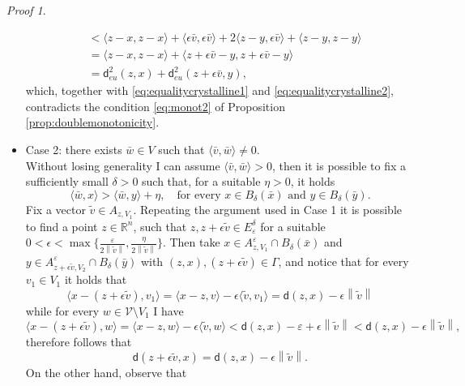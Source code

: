 \documentclass[11pt,twoside,a4paper]{article}
\newcommand{\scal}[2]{\ensuremath{\langle #1 , #2 \rangle}} %
\newcommand{\norm}[1]{\left\lVert#1\right\rVert}
\newcommand{\R}{\mathbb{R}}
\newcommand{\thmsymbol}{\( \square \)}
\newcommand{\di}{\mathsf d} %
\theoremstyle{theorem}
\theoremstyle{definition}
\theoremstyle{remark}
\theoremstyle{proof}
\newtheorem*{pro}{Proof}
\newenvironment{pr}{\begin{pro}%
 \renewcommand{\qedsymbol}{\thmsymbol}\pushQED{\qed}}%
 {\popQED\end{pro}}
\begin{document}
\begin{pr}
\begin{itemize}
\begin{align*}
        &< \scal{z-x}{z-x}+\scal{\epsilon \bar v}{\epsilon \bar v}+2\scal{z-y}{\epsilon \bar v}+ \scal{z-y}{z-y} \\
        &=  \scal{z-x}{z-x} + \scal{z+\epsilon \bar v-y}{ z+\epsilon \bar v -y} \\
        &= \di_{eu}^2 (z,x) + \di_{eu}^2(z+\epsilon \bar v, y),
    \end{align*}
    which, together with \eqref{eq:equalitycrystalline1} and \eqref{eq:equalitycrystalline2}, contradicts the condition \eqref{eq:monot2} of Proposition \ref{prop:doublemonotonicity}.
    \item Case 2: there exists $\bar w \in V$ such that $\scal{\bar v}{\bar w}\ne 0$.\\
    Without losing generality I can assume $\scal{\bar v}{\bar w}> 0$, then it is possible to fix a sufficiently small $\delta>0$ such that, for a suitable $\eta>0$, it holds
     \begin{equation*}
        \scal{\bar w}{x}> \scal{\bar w}{y}+\eta, \quad \text{for every } x \in B_\delta (\bar x) \text{ and } y \in B_\delta (\bar y). 
    \end{equation*}
    Fix a vector $\tilde v \in A_{z,V_1}$. Repeating the argument used in Case 1 it is possible to find a point $z\in \R^n$, such that $z,z+\epsilon\tilde v \in E_\varepsilon^\delta$ for a suitable $0<\epsilon< \max \big\{ \frac \varepsilon {2 \norm{\tilde v}}, \frac  \eta {2 \norm{\tilde v}} \big\}$. Then take $x\in A_{z,V_1}^\varepsilon\cap B_\delta(\bar x)$ and $y\in A_{z+\epsilon \tilde v,V_2}^\varepsilon \cap B_\delta(\bar y)$ with $(z,x),(z+\epsilon\tilde v)\in \Gamma$, and notice that for every $v_1 \in V_1$ it holds that
    \begin{equation*}
        \scal{x-(z+\epsilon \tilde v)}{v_1} = \scal{x-z}{v}  - \epsilon \scal{ \tilde v}{v_1}= \di (z,x) - \epsilon \norm{\tilde v}
    \end{equation*}
    while for every $w\in \mathcal V \setminus V_1$ I have
    \begin{equation*}
        \scal{x-(z+\epsilon \tilde v)}{w} = \scal{x-z}{w}  - \epsilon \scal{ \tilde v}{w}< \di (z,x) - \varepsilon + \epsilon \norm{\tilde v} < \di (z,x) - \epsilon \norm{\tilde v},
    \end{equation*}
   therefore follows that
   \begin{equation}\label{eq:exactnorm}
       \di (z+\epsilon\tilde v, x) = \di (z,x) - \epsilon \norm{\tilde v}.
   \end{equation}
   On the other hand, observe that 

\end{itemize}
\end{pr}
\end{document}
